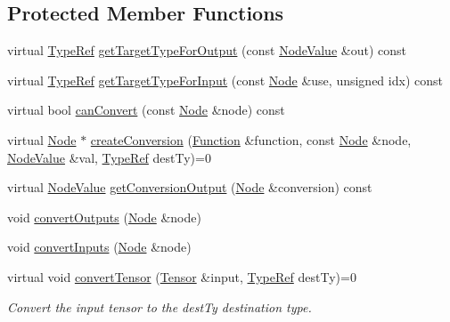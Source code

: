 \subsection*{Protected Member Functions}
\begin{DoxyCompactItemize}
\item 
virtual \hyperlink{structglow_1_1_type}{Type\+Ref} \hyperlink{classglow_1_1_function_converter_a015dfed23796395ce34c7ca4766c7854}{get\+Target\+Type\+For\+Output} (const \hyperlink{structglow_1_1_node_value}{Node\+Value} \&out) const
\item 
virtual \hyperlink{structglow_1_1_type}{Type\+Ref} \hyperlink{classglow_1_1_function_converter_a2039ff94d1abe52dc89d3f7d3350c772}{get\+Target\+Type\+For\+Input} (const \hyperlink{classglow_1_1_node}{Node} \&use, unsigned idx) const
\item 
virtual bool \hyperlink{classglow_1_1_function_converter_a6f49461b0e1845488f1dfac4531ec898}{can\+Convert} (const \hyperlink{classglow_1_1_node}{Node} \&node) const
\item 
virtual \hyperlink{classglow_1_1_node}{Node} $\ast$ \hyperlink{classglow_1_1_function_converter_a03251a5ce1b3485e0fa5dd70faaa0a35}{create\+Conversion} (\hyperlink{classglow_1_1_function}{Function} \&function, const \hyperlink{classglow_1_1_node}{Node} \&node, \hyperlink{structglow_1_1_node_value}{Node\+Value} \&val, \hyperlink{structglow_1_1_type}{Type\+Ref} dest\+Ty)=0
\item 
virtual \hyperlink{structglow_1_1_node_value}{Node\+Value} \hyperlink{classglow_1_1_function_converter_a37f0cb91037a83c63f9a7a7e6a987ad6}{get\+Conversion\+Output} (\hyperlink{classglow_1_1_node}{Node} \&conversion) const
\item 
void \hyperlink{classglow_1_1_function_converter_a43d6b9f872bceb962dfb3e492158e112}{convert\+Outputs} (\hyperlink{classglow_1_1_node}{Node} \&node)
\item 
void \hyperlink{classglow_1_1_function_converter_adb30ff2f805fc710e1a2ca325afbebe9}{convert\+Inputs} (\hyperlink{classglow_1_1_node}{Node} \&node)
\item 
\mbox{\label{classglow_1_1_function_converter_aee4d972d366a6edeaa7d71f97d9315e9}} 
virtual void \hyperlink{classglow_1_1_function_converter_aee4d972d366a6edeaa7d71f97d9315e9}{convert\+Tensor} (\hyperlink{classglow_1_1_tensor}{Tensor} \&input, \hyperlink{structglow_1_1_type}{Type\+Ref} dest\+Ty)=0
\begin{DoxyCompactList}\small\item\em Convert the {\ttfamily input} tensor to the {\ttfamily dest\+Ty} destination type. \end{DoxyCompactList}\item 

\end{DoxyCompactItemize}
